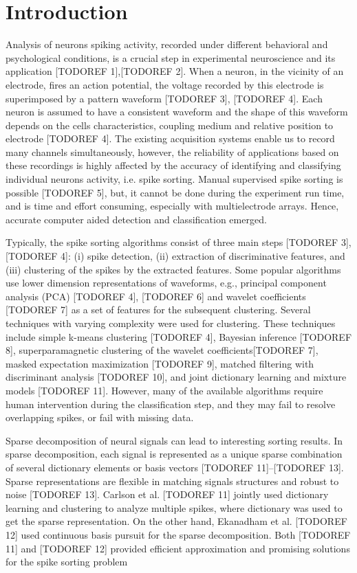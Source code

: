 \documentclass[conference]{IEEEtran}
\begin{document}
	\section{Introduction}
	Analysis of neurons spiking activity, recorded under different behavioral and psychological conditions, is a crucial step in experimental neuroscience and its application [TODOREF 1],[TODOREF 2]. When a neuron, in the vicinity of an electrode, fires an action potential, the voltage recorded by this electrode is superimposed by a pattern waveform [TODOREF 3], [TODOREF 4]. Each neuron is assumed to have a consistent waveform and the shape of this waveform depends on the cells characteristics, coupling medium and relative position to electrode [TODOREF 4]. The existing acquisition systems enable us to record many channels simultaneously, however, the reliability of applications based on these recordings is highly affected by the accuracy of identifying and classifying individual neurons activity, i.e. spike sorting. Manual supervised spike sorting is possible [TODOREF 5], but, it cannot be done during the experiment run time, and is time and effort consuming, especially with multielectrode arrays. Hence, accurate computer aided detection and classification emerged.
	
	Typically, the spike sorting algorithms consist of three main steps [TODOREF 3], [TODOREF 4]: (i) spike detection, (ii) extraction of discriminative features, and (iii) clustering of the spikes by the extracted features. Some popular algorithms use lower dimension representations of waveforms, e.g., principal component analysis (PCA) [TODOREF 4], [TODOREF 6] and wavelet coefficients [TODOREF 7] as a set of features for the subsequent clustering. Several techniques with varying complexity were used for clustering. These techniques include simple k-means clustering [TODOREF 4], Bayesian inference [TODOREF 8], superparamagnetic clustering of the wavelet coefficients[TODOREF 7], masked expectation maximization [TODOREF 9], matched filtering with discriminant analysis [TODOREF 10], and joint dictionary learning and mixture models [TODOREF 11]. However, many of the available algorithms require human intervention during the classification step, and they may fail to resolve overlapping spikes, or fail with missing data.
	
	Sparse decomposition of neural signals can lead to interesting sorting results. In sparse decomposition, each signal is represented as a unique sparse combination of several dictionary elements or basis vectors [TODOREF 11]–[TODOREF 13]. Sparse representations are flexible in matching signals structures and robust to noise [TODOREF 13]. Carlson et al. [TODOREF 11] jointly used dictionary learning and clustering to analyze multiple spikes, where dictionary was used to get the sparse representation. On the other hand, Ekanadham et al. [TODOREF 12] used continuous basis pursuit for the sparse decomposition. Both [TODOREF 11] and [TODOREF 12] provided efficient approximation and promising solutions for the spike sorting problem
	
\end{document}
